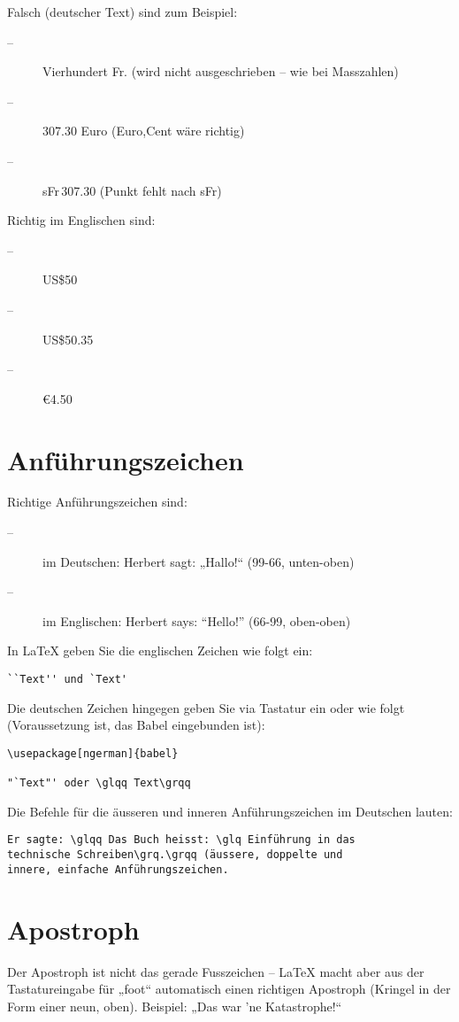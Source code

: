 Falsch (deutscher Text) sind zum Beispiel:
\begin{description}
  \item[--] Vierhundert Fr. (wird nicht ausgeschrieben -- wie bei Masszahlen)
  \item[--] 307.30 Euro (Euro,Cent wäre richtig)
  \item[--] sFr\,307.30 (Punkt fehlt nach sFr)
\end{description}

Richtig im Englischen sind:
\begin{description}
  \item[--] US\$50
  \item[--] US\$50.35
  \item[--] €4.50
\end{description}

\section{Anführungszeichen}

Richtige Anführungszeichen sind:
\begin{description}
  \item[--] im Deutschen: Herbert sagt: „Hallo!“ (99-66, unten-oben)
  \item[--] im Englischen: Herbert says: ``Hello!'' (66-99, oben-oben)
\end{description}

In LaTeX geben Sie die englischen Zeichen wie folgt ein:
\begin{verbatim}
``Text'' und `Text'
\end{verbatim}

Die deutschen Zeichen hingegen geben Sie via Tastatur ein oder wie folgt 
(Voraussetzung ist, das Babel eingebunden ist):
\begin{verbatim}
\usepackage[ngerman]{babel}

"`Text"' oder \glqq Text\grqq
\end{verbatim}

Die Befehle für die äusseren und inneren Anführungszeichen im Deutschen lauten:
\begin{verbatim}
Er sagte: \glqq Das Buch heisst: \glq Einführung in das 
technische Schreiben\grq.\grqq (äussere, doppelte und 
innere, einfache Anführungszeichen.
\end{verbatim}

\section{Apostroph}

Der Apostroph ist nicht das gerade Fusszeichen – LaTeX macht aber aus der 
Tastatur\-eingabe für „foot“ automatisch einen richtigen Apostroph 
(Kringel in der Form einer neun, oben). \hfill \break
Beispiel: „Das war 'ne Katastrophe!“